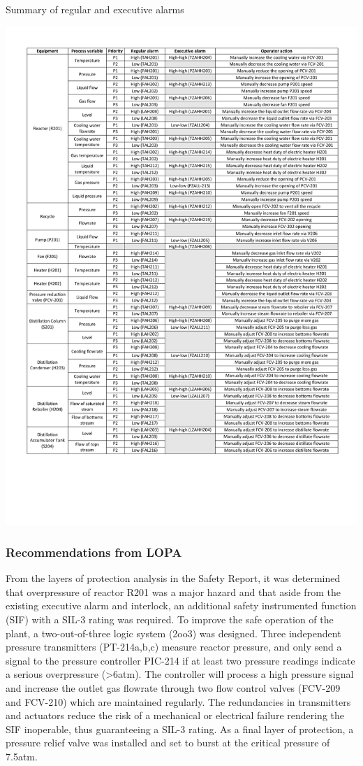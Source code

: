 \begin{table}[H]

  \caption{Summary of regular and executive alarms}
\includegraphics[clip, trim=1cm 4cm 1cm 1cm,  width=\linewidth]{chapters/4-operation-control/4-Figures/Alarms.pdf}
\label{tab:alarms}
\end{table}

\subsubsection{Recommendations from LOPA} %
From the layers of protection analysis in the Safety Report, it was determined that overpressure of reactor R201 was a major hazard and that aside from the existing executive alarm and interlock, an additional safety instrumented function (SIF) with a SIL-3 rating was required. To improve the safe operation of the plant, a two-out-of-three logic system (2oo3) was designed. Three independent pressure transmitters (PT-214a,b,c) measure reactor pressure, and only send a signal to the pressure controller PIC-214 if at least two pressure readings indicate a serious overpressure (>6atm). The controller will process a high pressure signal and increase the outlet gas flowrate through two flow control valves (FCV-209 and FCV-210) which are maintained regularly. The redundancies in transmitters and actuators reduce the risk of a mechanical or electrical failure rendering the SIF inoperable, thus guaranteeing a SIL-3 rating. As a final layer of protection, a pressure relief valve was installed and set to burst at the critical pressure of 7.5atm.